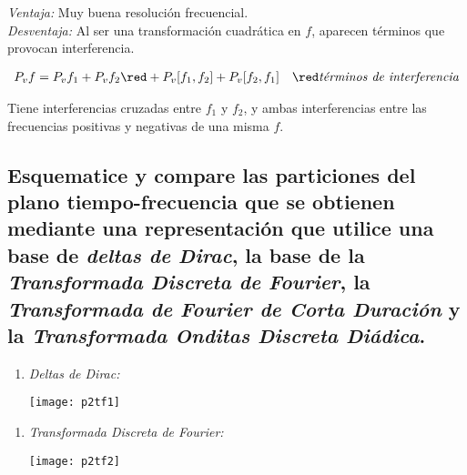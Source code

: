 \documentclass[a4paper,10pt,spanish,oneside]{article}
\begin{document}
\textit{Ventaja:} Muy buena resolución frecuencial.\\

\textit{Desventaja:} Al ser una transformación cuadrática en $f$, aparecen términos que provocan interferencia.

\begin{align*}
P_{v}f &= P_{v}f_{1}+P_{v}f_{2}{\red +P_{v}[f_{1},f_{2}]+P_{v}[f_{2},f_{1}]}
& {\red \textit{términos de interferencia}}
\end{align*}

Tiene interferencias cruzadas entre $f_{1}$ y $f_{2}$, y ambas interferencias entre las frecuencias positivas y negativas de una misma $f$.

\subsection{Esquematice y compare las particiones del plano tiempo-frecuencia que se obtienen mediante una representación que utilice una base de \textit{deltas de Dirac}, la base de la \textit{Transformada Discreta de Fourier}, la \textit{Transformada de Fourier de Corta Duración} y la \textit{Transformada Onditas Discreta Diádica}.}

\begin{minipage}{0.5\linewidth}

\begin{enumerate}[1.]
\item \textit{Deltas de Dirac:}

\begin{center}
\texttt{[image: p2tf1]}
\end{center}

\end{enumerate}

\end{minipage} \hfill \begin{minipage}{0.5\linewidth}

\begin{enumerate}[2.]

\item \textit{Transformada Discreta de Fourier:}

\begin{center}
\texttt{[image: p2tf2]}
\end{center}

\end{enumerate}

\end{minipage}
\end{document}
